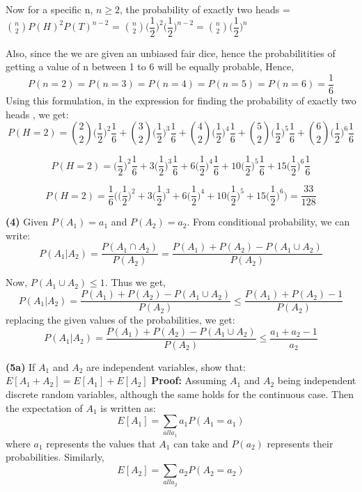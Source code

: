 \documentclass{article}
\renewcommand\part[1]{\vspace{.10in}\textbf{(#1)}}
\begin{document}
  Now for a specific n, $n \geq 2 $, the probability of exactly two heads = $\binom{n}{2} P(H)^2P(T)^{n-2}$ = $\binom{n}{2}\bigg (\dfrac{1}{2} \bigg )^2 \bigg ( \dfrac{1}{2} \bigg)^{n-2} = \binom{n}{2}\bigg ( \dfrac{1}{2} \bigg)^n$

  Also, since the we are given an unbiased fair dice, hence the probabilitities of getting a value of n between 1 to 6 will be equally probable, Hence, \newline
  \[ P(n=2) = P(n=3) = P(n=4) = P(n=5) = P(n=6) = \dfrac{1}{6} \]
  Using this formulation, in the expression for finding the probability of exactly two heads , we get:
  \[P(H=2) = \binom{2}{2}\bigg ( \dfrac{1}{2} \bigg )^2\dfrac{1}{6} + \binom{3}{2}\bigg ( \dfrac{1}{2} \bigg )^3\dfrac{1}{6} + \binom{4}{2}\bigg ( \dfrac{1}{2} \bigg )^4\dfrac{1}{6} + \binom{5}{2}\bigg ( \dfrac{1}{2} \bigg )^5\dfrac{1}{6} + \binom{6}{2}\bigg ( \dfrac{1}{2} \bigg )^6\dfrac{1}{6}\]

  \[P(H=2) = \bigg ( \dfrac{1}{2} \bigg )^2\dfrac{1}{6} + 3\bigg ( \dfrac{1}{2} \bigg )^3\dfrac{1}{6} + 6\bigg ( \dfrac{1}{2} \bigg )^4\dfrac{1}{6} + 10\bigg ( \dfrac{1}{2} \bigg )^5\dfrac{1}{6} + 15\bigg ( \dfrac{1}{2} \bigg )^6\dfrac{1}{6}\]

  \[P(H=2) = \dfrac{1}{6} \bigg (\bigg ( \dfrac{1}{2} \bigg )^2 + 3\bigg ( \dfrac{1}{2} \bigg )^3 + 6\bigg ( \dfrac{1}{2} \bigg )^4 + 10\bigg ( \dfrac{1}{2} \bigg )^5 + 15\bigg ( \dfrac{1}{2} \bigg )^6 \bigg ) = \dfrac{33}{128}\]

  \part{4} 
  Given $P(A_1) = a_1$ and $P(A_2) = a_2$. From conditional probability, we can write: 
  \[P(A_1 | A_2) = \dfrac{P(A_1 \cap A_2)}{P(A_2)} = \dfrac{P(A_1) + P(A_2) - P(A_1 \cup A_2)}{P(A_2)} \]

  Now, $P(A_1 \cup A_2) \leq 1$. Thus we get,
  \[P(A_1 | A_2) = \dfrac{P(A_1) + P(A_2) - P(A_1 \cup A_2)}{P(A_2)} \leq \dfrac{P(A_1) + P(A_2) - 1}{P(A_2)} \]
  replacing the given values of the probabilities, we get: \newline
  \[P(A_1 | A_2) = \dfrac{P(A_1) + P(A_2) - P(A_1 \cup A_2)}{P(A_2)} \leq \dfrac{a_1 + a_2 - 1}{a_2} \]


  \part{5a} If $A_1$ and $A_2$ are independent variables, show that: $E[A_1 + A_2] = E[A_1] + E[A_2]$ \newline
  \textbf{Proof:} Assuming $A_1$ and $A_2$ being independent discrete random variables, although the same holds for the continuous case.
  Then the expectation of $A_1$ is written as:
  \[E[A_1] = \sum_{all a_1} a_1P(A_1 = a_1)\]
  where $a_1$ represents the values that $A_1$ can take and $P(a_2)$ represents their probabilities. \newline
  Similarly,
  \[E[A_2] = \sum_{all a_2} a_2P(A_2 = a_2) \]
\end{document}

